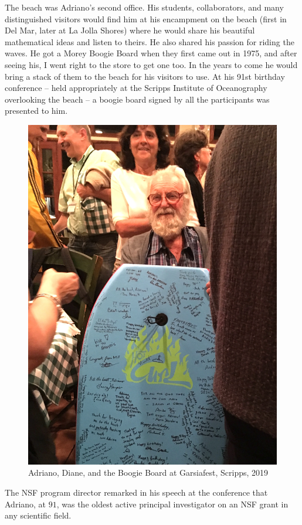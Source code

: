 \documentclass{notices}
\begin{document}
The beach was Adriano's second office. 
His students, collaborators, and many distinguished visitors would find him at his  encampment on the beach (first in Del Mar, later at La Jolla Shores) where he would share his beautiful mathematical ideas and listen to theirs. He also shared his passion for riding the waves.
He got a Morey Boogie Board when they first came out in 1975, and after seeing his, I went right to the store to get one too. In the years to come he would bring a stack of them to the beach for his visitors to use.
  At his 91st birthday conference -- held appropriately at the Scripps Institute of Oceanography overlooking the beach -- a boogie board signed by all the participants was presented to him.
  \begin{figure}
    \centering
    \includegraphics[width=0.95\linewidth]{Michelle_Wachs/IMG_4082.jpeg} 
 {\footnotesize Adriano, Diane, and the Boogie Board at Garsiafest, Scripps, 2019}
\end{figure}
The NSF program director remarked in his speech at the conference that Adriano, at $91$, was the oldest active principal investigator on an NSF grant in any scientific field. 
\end{document}
